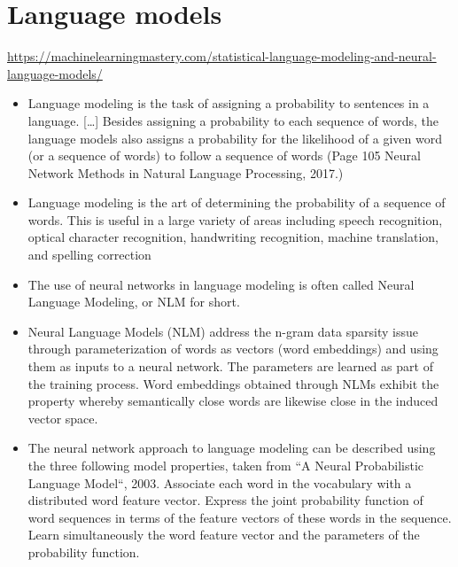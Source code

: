 \section{Language models}
\url{https://machinelearningmastery.com/statistical-language-modeling-and-neural-language-models/}
\begin{itemize}
  \item Language modeling is the task of assigning a probability to sentences in a language. […] Besides assigning a probability to each sequence of words, the language models also assigns a probability for the likelihood of a given word (or a sequence of words) to follow a sequence of words (Page 105 Neural Network Methods in Natural Language Processing, 2017.)
  \item Language modeling is the art of determining the probability of a sequence of words. This is useful in a large variety of areas including speech recognition, optical character recognition, handwriting recognition, machine translation, and spelling correction
  \item The use of neural networks in language modeling is often called Neural Language Modeling, or NLM for short.
  \item Neural Language Models (NLM) address the n-gram data sparsity issue through parameterization of words as vectors (word embeddings) and using them as inputs to a neural network. The parameters are learned as part of the training process. Word embeddings obtained through NLMs exhibit the property whereby semantically close words are likewise close in the induced vector space.
  \item The neural network approach to language modeling can be described using the three following model properties, taken from “A Neural Probabilistic Language Model“, 2003.
      Associate each word in the vocabulary with a distributed word feature vector. Express the joint probability function of word sequences in terms of the feature vectors of these words in the sequence. Learn simultaneously the word feature vector and the parameters of the probability function.
\end{itemize}

